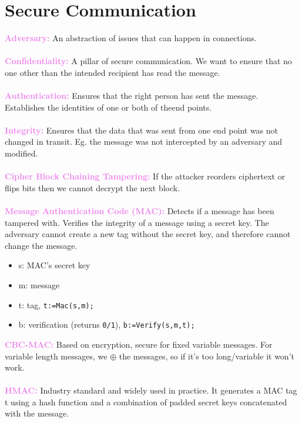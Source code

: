 \documentclass[a4paper,10pt]{article}
\begin{document}
\section{Secure Communication}
\textcolor{Violet}{\textbf{Adversary:}} An abstraction of issues that can happen in connections. \\\\
\textcolor{Violet}{\textbf{Confidentiality:}} A pillar of secure communication. We want to ensure that no one other than the intended recipient has read the message. \\\\
\textcolor{Violet}{\textbf{Authentication:}} Ensures that the right person has sent the message. Establishes the identities of one or both of theend points.\\\\
\textcolor{Violet}{\textbf{Integrity:}} Ensures that the data that was sent from one end point was not changed in transit. Eg. the message was not intercepted by an adversary and modified. \\\\
\textcolor{Violet}{\textbf{Cipher Block Chaining Tampering:}} If the attacker reorders ciphertext or flips bits then we cannot decrypt the next block. \\\\
\textcolor{Violet}{\textbf{Message Authentication Code (MAC):}} Detects if a message has been tampered with. Verifies the integrity of a message using a secret key. The adversary cannot create a new tag without the secret key, and therefore cannot change the message.
\begin{itemize}
\item s: MAC's secret key
\item m: message
\item t: tag, \texttt{t:=Mac(s,m);}
\item b: verification (returns \texttt{0/1}), \texttt{b:=Verify(s,m,t);}
\end{itemize} 
\textcolor{Violet}{\textbf{CBC-MAC:}} Based on encryption, secure for fixed variable messages. For variable length messages, we $\oplus$ the messages, so if it's too long/variable it won't work.\\\\
\textcolor{Violet}{\textbf{HMAC:}} Industry standard and widely used in practice. It generates a MAC tag t using a hash function and a combination of padded secret keys concatenated with the message. \\ \\
\end{document}
